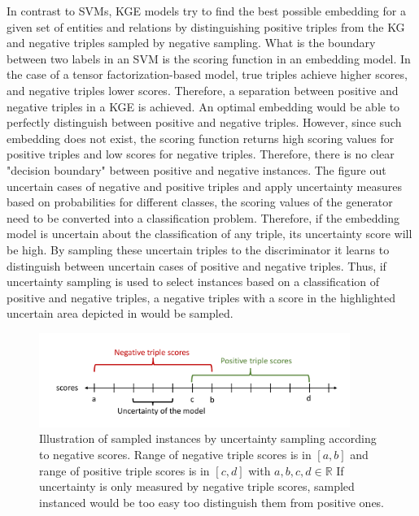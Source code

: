 In contrast to \acp{SVM}, \ac{KGE} models try to find the best possible embedding for a given set of entities and relations by distinguishing positive triples from the \ac{KG} and negative triples sampled by negative sampling.
What is the boundary between two labels in an \ac{SVM} is the scoring function in an embedding model.
In the case of a tensor factorization-based model, true triples achieve higher scores, and negative triples lower scores.
Therefore, a separation between positive and negative triples in a \ac{KGE} is achieved.
An optimal embedding would be able to perfectly distinguish between positive and negative triples.
However, since such embedding does not exist, the scoring function returns high scoring values for positive triples and low scores for negative triples.
Therefore, there is no clear "decision boundary" between positive and negative instances.
The figure out uncertain cases of negative and positive triples and apply uncertainty measures based on probabilities for different classes, the scoring values of the generator need to be converted into a classification problem.
Therefore, if the embedding model is uncertain about the classification of any triple, its uncertainty score will be high.
By sampling these uncertain triples to the discriminator it learns to distinguish between uncertain cases of positive and negative triples.
Thus, if uncertainty sampling is used to select instances based on a classification of positive and negative triples, a negative triples with a score in the highlighted uncertain area depicted in  would be sampled.
\begin{figure}[H]
  \centering
    \includegraphics[width=0.9\textwidth]{figures/badVsGoodApproach.pdf}
  \caption{Illustration of sampled instances by uncertainty sampling according to negative scores.
  Range of negative triple scores is in $[a, b]$ and range of positive triple scores is in  $[c, d]$ with $a,b,c,d \in \mathbb{R}$
  If uncertainty is only measured by negative triple scores, sampled instanced would be too easy too distinguish them from positive ones.}
  \label{fig:badVsGoodApproach}
\end{figure}
